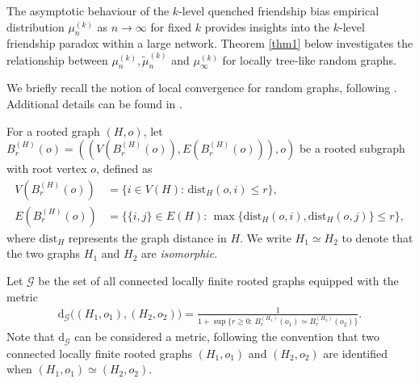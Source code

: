 \documentclass[11pt]{article}
\numberwithin{equation}{section}
\theoremstyle{plain}
\begin{document}
The asymptotic behaviour of the $k$-level quenched friendship bias empirical distribution $\mu_{n}^{(k)}$ as $n\to\infty$ for fixed $k$ provides insights into the $k$-level friendship paradox within a large network. Theorem \ref{thm1} below investigates the relationship between $\mu_{n}^{(k)},\tilde{\mu}_{n}^{(k)}$ and $\mu^{(k)}_{\infty}$ for locally tree-like random graphs.

We briefly recall the notion of local convergence for random graphs, following \cite[Section 2]{HHP}. Additional details can be found in \cite[Chapter 2]{RvdH2}.

For a rooted graph $(H,o)$, let $B_{r}^{(H)}(o) = ((V(B_{r}^{(H)}(o)),E(B_{r}^{(H)}(o))),o)$ be a rooted subgraph with root vertex $o$, defined as
\begin{equation*}
\begin{aligned}
V(B_{r}^{(H)}(o)) &= \big\{i\in V(H)\colon\,\mathrm{dist}_{H}(o,i)\leq r\big\},\\
E(B_{r}^{(H)}(o)) &= \big\{\{i,j\}\in E(H)\colon\,\max\{\mathrm{dist}_{H}(o,i),\mathrm{dist}_{H}(o,j)\}\leq r\big\},
\end{aligned}
\end{equation*}
where $\mathrm{dist}_{H}$ represents the graph distance in $H$. We write $H_1 \simeq H_2$ to denote that the two graphs $H_1$ and $H_2$ are \emph{isomorphic}. 

Let $\mathscr{G}$ be the set of all connected locally finite rooted graphs equipped with the metric
\begin{align*}
\mathrm{d}_{\mathscr{G}}\big((H_{1},o_{1}),(H_{2},o_{2})\big)
	= \frac{1}{1+\sup\{r\geq 0\colon\,B_{r}^{(H_1)}(o_1) \simeq B_{r}^{(H_2)}(o_2)\}}.
\end{align*}
Note that $\mathrm{d}_{\mathscr{G}}$ can be considered a metric, following the convention that two connected locally finite rooted graphs $(H_{1},o_{1})$ and $(H_{2},o_{2})$ are identified when $(H_{1},o_{1}) \simeq (H_{2},o_{2})$. 
\end{document}
